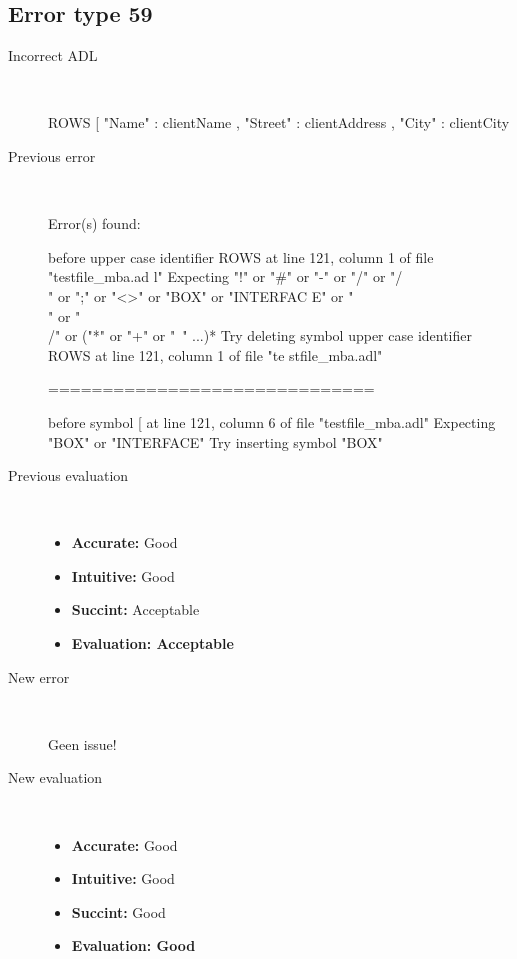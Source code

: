 \hrulefill

\subsection{Error type 59}
  \begin{description}
  \item[Incorrect ADL]~\\
\begin{adl}
ROWS [ "Name"   : clientName
    , "Street" : clientAddress
    , "City"   : clientCity\end{adl}
  \item[Previous error]~\\
\begin{haskell}
Error(s) found:

before upper case identifier ROWS at line 121, column 1 of file "testfile_mba.ad
l"
Expecting "!" or "#" or "-" or "/" or "/\\" or ";" or "<>" or "BOX" or "INTERFAC
E" or "\\" or "\\/" or ("*" or "+" or "~" ...)*
Try deleting symbol upper case identifier ROWS at line 121, column 1 of file "te
stfile_mba.adl"

==============================

before symbol [ at line 121, column 6 of file "testfile_mba.adl"
Expecting "BOX" or "INTERFACE"
Try inserting symbol "BOX"

\end{haskell}
  \item[Previous evaluation]~\\
    \begin{itemize}
    \item \textbf{Accurate:} Good
    \item \textbf{Intuitive:} Good
    \item \textbf{Succint:} Acceptable
    \item \textbf{Evaluation: Acceptable}
    \end{itemize}
  \item[New error]~\\
\begin{haskell}
Geen issue!\end{haskell}
  \item[New evaluation]~\\
    \begin{itemize}
    \item \textbf{Accurate:} Good
    \item \textbf{Intuitive:} Good
    \item \textbf{Succint:} Good
    \item \textbf{Evaluation: Good
}
    \end{itemize}
  \end{description}

